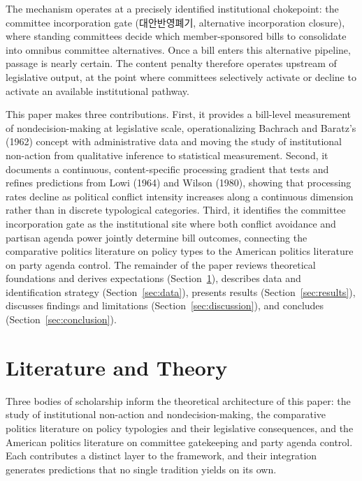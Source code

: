 \documentclass[11pt]{article}
\begin{document}
The mechanism operates at a precisely identified institutional chokepoint: the committee incorporation gate (대안반영폐기, alternative incorporation closure), where standing committees decide which member-sponsored bills to consolidate into omnibus committee alternatives. Once a bill enters this alternative pipeline, passage is nearly certain. The content penalty therefore operates upstream of legislative output, at the point where committees selectively activate or decline to activate an available institutional pathway.

This paper makes three contributions. First, it provides a bill-level measurement of nondecision-making at legislative scale, operationalizing Bachrach and Baratz's (1962) concept with administrative data and moving the study of institutional non-action from qualitative inference to statistical measurement. Second, it documents a continuous, content-specific processing gradient that tests and refines predictions from Lowi (1964) and Wilson (1980), showing that processing rates decline as political conflict intensity increases along a continuous dimension rather than in discrete typological categories. Third, it identifies the committee incorporation gate as the institutional site where both conflict avoidance and partisan agenda power jointly determine bill outcomes, connecting the comparative politics literature on policy types to the American politics literature on party agenda control. The remainder of the paper reviews theoretical foundations and derives expectations (Section~\ref{sec:theory}), describes data and identification strategy (Section~\ref{sec:data}), presents results (Section~\ref{sec:results}), discusses findings and limitations (Section~\ref{sec:discussion}), and concludes (Section~\ref{sec:conclusion}).


\section{Literature and Theory}
\label{sec:theory}

Three bodies of scholarship inform the theoretical architecture of this paper: the study of institutional non-action and nondecision-making, the comparative politics literature on policy typologies and their legislative consequences, and the American politics literature on committee gatekeeping and party agenda control. Each contributes a distinct layer to the framework, and their integration generates predictions that no single tradition yields on its own.
\end{document}
